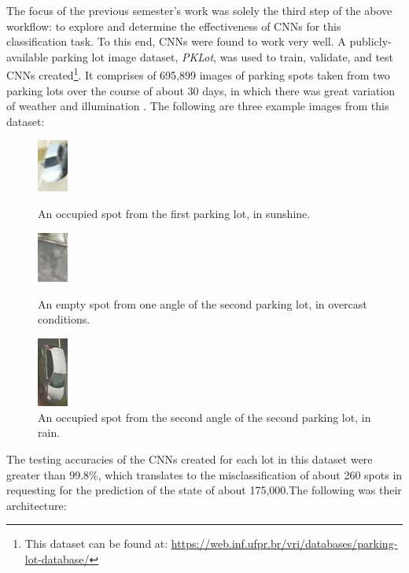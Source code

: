 \documentclass[a4paper, 11pt]{article} %
\begin{document}
	The focus of the previous semester's work was solely the third step of the above workflow: to 
	explore and determine the effectiveness of CNNs for this classification task. To this end, CNNs were 
	found to work very well. A publicly-available parking lot image dataset, \textit{PKLot}, was used to 
	train, validate, and test CNNs created\footnote{This dataset can be found at: 
	\hyperlink{https://web.inf.ufpr.br/vri/databases/parking-lot-database/}
	{https://web.inf.ufpr.br/vri/databases/parking-lot-database/}}. It comprises of 695,899 images of 
	parking spots taken from two parking lots over the course of about 30 days, in which there was 
	great variation of weather and illumination \cite{pklot-paper}\relax. The following are three example 
	images from this dataset:
	\vskip 5mm
	\begin{figure}[h]
		\centering
		\includegraphics[width=1cm]{figures/example_1.jpg}
		\caption{An occupied spot from the first parking lot, in sunshine.}
		\vspace{5mm}
		\includegraphics[width=1cm]{figures/example_2.jpg}
		\caption{An empty spot from one angle of the second parking lot, in overcast conditions.}
		\vspace{5mm}
		\includegraphics[width=1cm]{figures/example_3.jpg}
		\caption{An occupied spot from the second angle of the second parking lot, in rain.}
	\end{figure}
	\hspace*{-6mm}The testing accuracies of the CNNs created for each lot in this dataset were greater 
	than 99.8\%, which translates to the misclassification of about 260 spots in requesting for the 
	prediction of the state of about 175,000.The following was their architecture:
	\newpage
\end{document}
